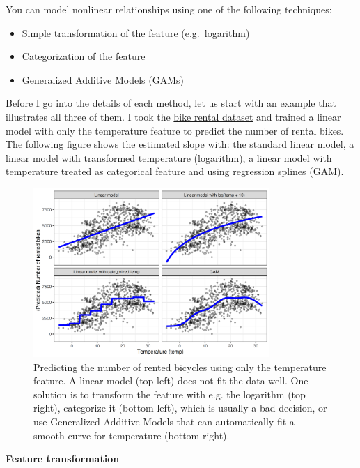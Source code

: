\documentclass[
  11pt,
]{scrbook}
\providecommand{\tightlist}{%
  \setlength{\itemsep}{0pt}\setlength{\parskip}{0pt}}
\begin{document}
You can model nonlinear relationships using one of the following techniques:

\begin{itemize}
\tightlist
\item
  Simple transformation of the feature (e.g.~logarithm)
\item
  Categorization of the feature
\item
  Generalized Additive Models (GAMs)
\end{itemize}

Before I go into the details of each method, let us start with an example that illustrates all three of them.
I took the \protect\hyperlink{bike-data}{bike rental dataset} and trained a linear model with only the temperature feature to predict the number of rental bikes.
The following figure shows the estimated slope with: the standard linear model, a linear model with transformed temperature (logarithm), a linear model with temperature treated as categorical feature and using regression splines (GAM).

\begin{figure}

{\centering \includegraphics[width=0.8\textwidth]{images/nonlinear-effects-1} 

}

\caption{Predicting the number of rented bicycles using only the temperature feature. A linear model (top left) does not fit the data well. One solution is to transform the feature with e.g. the logarithm (top right), categorize it (bottom left), which is usually a bad decision, or use Generalized Additive Models that can automatically fit a smooth curve for temperature (bottom right).}\label{fig:nonlinear-effects}
\end{figure}

\textbf{Feature transformation}
\end{document}
